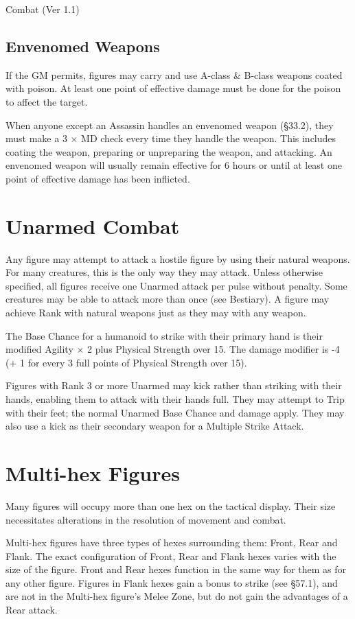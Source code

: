 \begin{Chapter}{Combat (Ver 1.1)}
\subsection{Envenomed Weapons}

If the GM permits, figures may carry and use A-class \& B-class
weapons coated with poison.  At least one point of effective damage
must be done for the poison to affect the target.

When anyone except an Assassin handles an envenomed weapon (§33.2),
they must make a 3 × MD check every time they handle the weapon.  This
includes coating the weapon, preparing or unpreparing the weapon, and
attacking. An envenomed weapon will usually remain effective for 6
hours or until at least one point of effective damage has been
inflicted.

\section{Unarmed Combat}

Any figure may attempt to attack a hostile figure by using their
natural weapons.  For many creatures, this is the only way they may
attack. Unless otherwise specified, all figures receive one Unarmed
attack per pulse without penalty.  Some creatures may be able to
attack more than once (see Bestiary). A figure may achieve Rank with
natural weapons just as they may with any weapon.

The Base Chance for a humanoid to strike with their primary hand is
their modified Agility × 2 plus Physical Strength over 15. The damage
modifier is -4 (+ 1 for every 3 full points of Physical Strength over
15).

Figures with Rank 3 or more Unarmed may kick rather than striking with
their hands, enabling them to attack with their hands full. They may
attempt to Trip with their feet; the normal Unarmed Base Chance and
damage apply.  They may also use a kick as their secondary weapon for
a Multiple Strike Attack.

\section{Multi-hex Figures}

Many figures will occupy more than one hex on the tactical display.
Their size necessitates alterations in the resolution of movement and
combat.

Multi-hex figures have three types of hexes surrounding them: Front,
Rear and Flank.  The exact configuration of Front, Rear and Flank
hexes varies with the size of the figure.  Front and Rear hexes
function in the same way for them as for any other figure.  Figures in
Flank hexes gain a bonus to strike (see §57.1), and are not in the
Multi-hex figure’s Melee Zone, but do not gain the advantages of a
Rear attack.


\end{Chapter}
